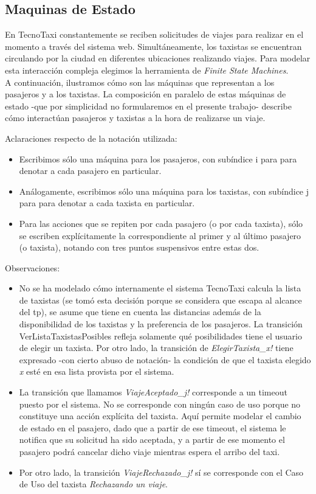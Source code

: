\subsection{Maquinas de Estado}

En TecnoTaxi constantemente se reciben solicitudes de viajes para realizar en el momento a 
través del sistema web. Simultáneamente, los taxistas se encuentran circulando por la ciudad 
en diferentes ubicaciones realizando viajes. Para modelar esta interacción compleja 
elegimos la herramienta de \textit{Finite State Machines}.
\\
A continuación, ilustramos cómo son las máquinas que representan a los pasajeros y a los 
taxistas. La composición en paralelo de estas máquinas de estado -que por simplicidad no 
formularemos en el presente trabajo- describe cómo interactúan pasajeros y taxistas a la 
hora de realizarse un viaje.

\vspace*{0.5cm}
Aclaraciones respecto de la notación utilizada:
\begin{itemize}
\item Escribimos sólo una máquina para los pasajeros, con subíndice i para para denotar a 
cada pasajero en particular.
\item Análogamente, escribimos sólo una máquina para los taxistas, con subíndice j para para 
denotar a cada taxista en particular.
\item Para las acciones que se repiten por cada pasajero (o por cada taxista), sólo se escriben explícitamente la correspondiente al primer y al último pasajero (o taxista), notando con tres puntos suspensivos entre estas dos.
\end{itemize}
\vspace{0.5cm}
Observaciones:
\begin{itemize}
\item No se ha modelado cómo internamente el sistema TecnoTaxi calcula la lista de taxistas (se tomó esta decisión porque se considera que escapa al alcance del tp), se asume que tiene en cuenta las distancias además de la disponibilidad de los taxistas y la preferencia de los pasajeros. La transición VerListaTaxistasPosibles refleja solamente qué posibilidades tiene el usuario de elegir un taxista. Por otro lado, la transición de \textit{ElegirTaxista\_x!} tiene expresado -con cierto abuso de notación- la condición de que el taxista elegido \textit{x} esté en esa lista provista por el sistema.
\item La transición que llamamos \textit{ViajeAceptado\_j!} corresponde a un timeout puesto por el sistema. No se corresponde con ningún caso de uso porque no constituye una acción explícita  del taxista. Aquí permite modelar el cambio de estado en el pasajero, dado que a partir de ese timeout, el sistema le notifica que su solicitud ha sido aceptada, y a partir de ese momento el pasajero podrá cancelar dicho viaje mientras espera el arribo del taxi.
\item Por otro lado, la transición \textit{ViajeRechazado\_j!} sí se corresponde con el Caso de Uso del taxista \textit{Rechazando un viaje}.
\end{itemize}

